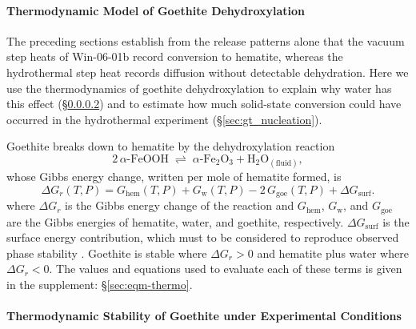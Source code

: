 \paragraph{Thermodynamic Model of Goethite Dehydroxylation}\label{sec:gt_thermo_methods}

The preceding sections establish from the release patterns alone that the vacuum step heats of
Win-06-01b record conversion to hematite, whereas the hydrothermal step heat records diffusion
without detectable dehydration. Here we use the thermodynamics of goethite dehydroxylation to
explain why water has this effect (\S\ref{sec:gt_thermo}) and to estimate how much solid-state
conversion could have occurred in the hydrothermal experiment (\S\ref{sec:gt_nucleation}).

Goethite breaks down to hematite by the dehydroxylation reaction
\begin{equation}
  2\,\alpha\text{-FeOOH} \;\rightleftharpoons\; \alpha\text{-Fe}_2\text{O}_3 + \text{H}_2\text{O}_{(\text{fluid})},
  \label{eq:gt_rxn}
\end{equation}
whose Gibbs energy change, written per mole of hematite formed, is
\begin{equation}
  \Delta G_r(T,P) = G_{\mathrm{hem}}(T,P) + G_{\mathrm{w}}(T,P) - 2\,G_{\mathrm{goe}}(T,P) + \Delta G_{\mathrm{surf}} .
  \label{eq:gt_dGr}
\end{equation}
where $\Delta G_r$ is the Gibbs energy change of the reaction and $G_{\mathrm{hem}}$, $G_{\mathrm{w}}$, and $G_{\mathrm{goe}}$ are the Gibbs energies of hematite, water, and goethite, respectively. 
$\Delta G_{\mathrm{surf}}$ is the surface energy contribution, which must to be considered to reproduce observed phase stability \citep{navrotsky2008}. 
Goethite is stable where $\Delta G_r>0$ and hematite plus water where $\Delta G_r<0$. The values and equations used to evaluate each of these terms is given in the supplement: \S\ref{sec:eqm-thermo}.

\paragraph{Thermodynamic Stability of Goethite under Experimental Conditions}\label{sec:gt_thermo}

